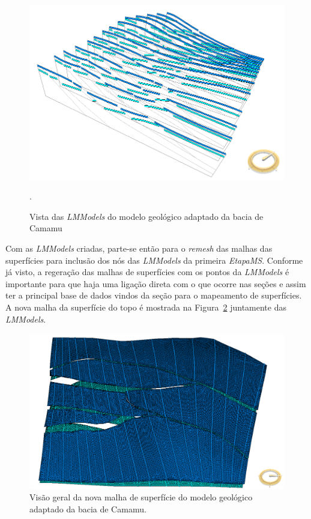 \begin{figure} [H]
  \begin{center}
    \includegraphics[width=320pt]{images/fig-lmmodel-ms}
    \caption{Vista das \textit{LMModels} do modelo geológico adaptado da bacia de Camamu}.\label{fig-example-2-3}
  \end{center}
\end{figure}

Com as \textit{LMModels} criadas, parte-se então para o \textit{remesh} das malhas das superfícies para inclusão dos nós das \textit{LMModels} da primeira \textit{EtapaMS}. Conforme já visto, a regeração das malhas de superfícies com os pontos da \textit{LMModels} é importante para que haja uma ligação direta com o que ocorre nas seções e assim ter a principal base de dados vindos da seção para o mapeamento de superfícies. A nova malha da superfície do topo é mostrada na Figura~\ref{fig-example-2-4} juntamente das \textit{LMModels}.

\begin{figure} [h]
  \begin{center}
    \includegraphics[width=\textwidth]{images/fig-example-2-3}
    \caption{Visão geral da nova malha de superfície do modelo geológico adaptado da bacia de Camamu.}\label{fig-example-2-4}
  \end{center}
\end{figure}

